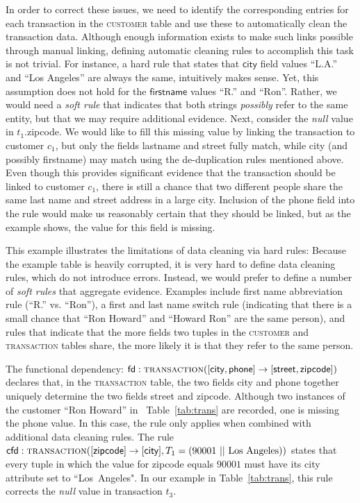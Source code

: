 
In order to correct these issues, we need to identify the corresponding entries for each transaction in the \textsc{customer} table and use these to automatically clean the transaction data. Although enough information exists to make such links possible through manual linking, defining automatic cleaning rules to accomplish this task is not trivial. For instance, a hard rule that states that $\textsf{city}$ field values ``L.A.'' and ``Los Angeles'' are always the same, intuitively makes sense. Yet, this assumption does not hold for the $\textsf{firstname}$ values ``R.'' and ``Ron''. Rather, we would need a \emph{soft rule} that indicates that both strings \emph{possibly} refer to the same entity, but that we may require additional evidence. Next, consider the \emph{null} value in $t_1.$\textsf{zipcode}. We would like to fill this missing value by linking the transaction to customer $c_1$, but only the fields \textsf{lastname} and \textsf{street} fully match, while \textsf{city} (and possibly \textsf{firstname}) may match using the de-duplication rules mentioned above. Even though this provides significant evidence that the transaction should be linked to customer $c_1$, there is still a chance that two different people share the same last name and street address in a large city. Inclusion of the \textsf{phone} field into the rule would make us reasonably certain that they should be linked, but as the example shows, the value for this field is missing. 

This example illustrates the limitations of data cleaning via hard rules: Because the example table is heavily corrupted, it is very hard to define data cleaning rules, which do not introduce errors. Instead, we would prefer to define a number of \emph{soft rules} that aggregate evidence. Examples include first name abbreviation rule (``R.'' vs. ``Ron''), a first and last name switch rule (indicating that there is a small chance that ``Ron Howard'' and ``Howard Ron'' are the same person), and rules that indicate that the more fields two tuples in the \textsc{customer} and \textsc{transaction} tables share, the more likely it is that they refer to the same person. 

The functional dependency: $\textsf{fd}: \textsc{transaction}([\textsf{city}, \textsf{phone}] \rightarrow [\textsf{street}, \textsf{zipcode}])$ declares that, in the \textsc{transaction} table, the two fields \textsf{city} and \textsf{phone} together 
uniquely determine the two fields \textsf{street} and \textsf{zipcode}. Although two instances of the customer ``Ron Howard'' in ~Table~\ref{tab:trans} are recorded, one is missing the \textsf{phone} value. In this case, the rule only applies when combined with additional data cleaning rules. The rule $\textsf{cfd}: \textsc{transaction}([\textsf{zipcode}] \rightarrow [\textsf{city}], T_1 =(90001~||~\text{Los~Angeles}))$ states that every tuple in which the value for \textsf{zipcode} equals $90001$ must have its \textsf{city} attribute set to ``Los~Angeles". In our example in Table~\ref{tab:trans}, this rule corrects the \emph{null} value in transaction $t_3$. 

